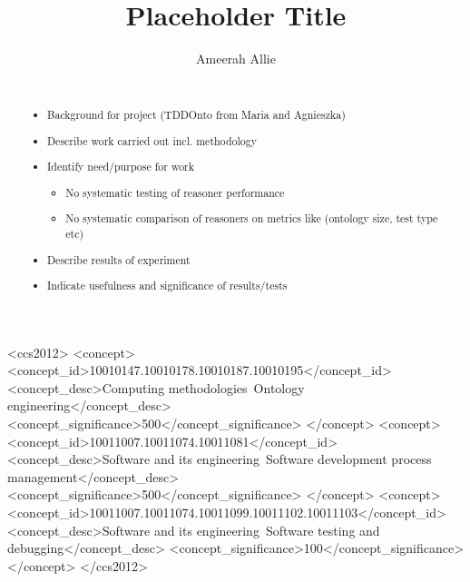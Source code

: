 \documentclass[draft]{sig-alternate-05-2015}
\newcommand{\todo}[1][]{\ifdraft{\ifthenelse{\isempty{#1}}{\hl{(TODO)}}{\hl{(TODO: #1)}}}{}}
\begin{document}
  
  \title{Placeholder Title}
  \author{
    \alignauthor
    Ameerah Allie\\
    \\
  }
  \maketitle

\begin{abstract}
  \todo
  \begin{itemize}
    \item Background for project (TDDOnto from Maria and Agnieszka)
    \item Describe work carried out incl. methodology
    \item Identify need/purpose for work
    \begin{itemize}
      \item No systematic testing of reasoner performance
      \item No systematic comparison of reasoners on metrics like (ontology size, test type etc)
    \end{itemize}
    \item Describe results of experiment
    \item Indicate usefulness and significance of results/tests
  \end{itemize}
\end{abstract}

\begin{CCSXML}
	<ccs2012>
    <concept>
      <concept_id>10010147.10010178.10010187.10010195</concept_id>
      <concept_desc>Computing methodologies~Ontology engineering</concept_desc>
      <concept_significance>500</concept_significance>
    </concept>
    <concept>
      <concept_id>10011007.10011074.10011081</concept_id>
      <concept_desc>Software and its engineering~Software development process management</concept_desc>
      <concept_significance>500</concept_significance>
    </concept>
    <concept>
      <concept_id>10011007.10011074.10011099.10011102.10011103</concept_id>
      <concept_desc>Software and its engineering~Software testing and debugging</concept_desc>
      <concept_significance>100</concept_significance>
    </concept>
	</ccs2012>
\end{CCSXML}

\end{document}
